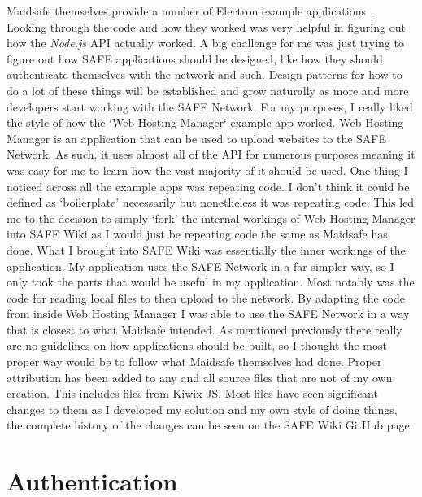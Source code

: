 Maidsafe themselves provide a number of Electron example applications\cite{example-apps} . Looking through the code and how they worked was very helpful in figuring out how the \textit{Node.js} API actually worked. A big challenge for me was just trying to figure out how SAFE applications should be designed, like how they should authenticate themselves with the network and such. Design patterns for how to do a lot of these things will be established and grow naturally as more and more developers start working with the SAFE Network. For my purposes, I really liked the style of how the `Web Hosting Manager`\cite{web-hosting-manager} example app worked. Web Hosting Manager is an application that can be used to upload websites to the SAFE Network. As such, it uses almost all of the API for numerous purposes meaning it was easy for me to learn how the vast majority of it should be used. One thing I noticed across all the example apps was repeating code. I don't think it could be defined as `boilerplate' necessarily but nonetheless it was repeating code. This led me to the decision to simply `fork' the internal workings of Web Hosting Manager into SAFE Wiki as I would just be repeating code the same as Maidsafe has done. What I brought into SAFE Wiki was essentially the inner workings of the application. My application uses the SAFE Network in a far simpler way, so I only took the parts that would be useful in my application. Most notably was the code for reading local files to then upload to the network. By adapting the code from inside Web Hosting Manager I was able to use the SAFE Network in a way that is closest to what Maidsafe intended. As mentioned previously there really are no guidelines on how applications should be built, so I thought the most proper way would be to follow what Maidsafe themselves had done. Proper attribution has been added to any and all source files that are not of my own creation. This includes files from Kiwix JS. Most files have seen significant changes to them as I developed my solution and my own style of doing things, the complete history of the changes can be seen on the SAFE Wiki GitHub page.

\section{Authentication}

